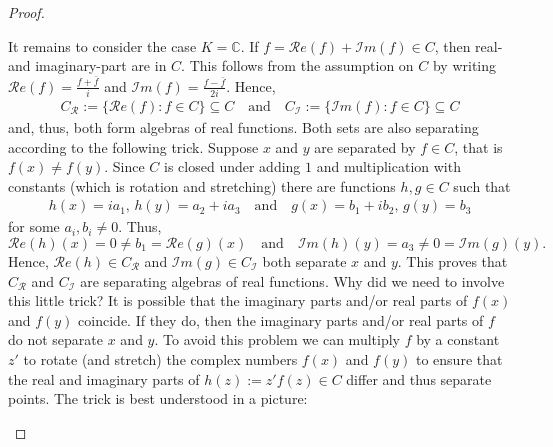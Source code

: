 \begin{proof}[Proof]
\begin{enumerate}[label=(\roman*)]
\end{enumerate}
It remains to consider the case $K = \mathbb{C}$. If $f =\mathcal{R}e(f)+\mathcal{I}m(f) \in C$, then real- and imaginary-part are in $C$. This follows from the assumption on $C$ by writing $\mathcal{R}e(f) = \frac{f + \bar{f}}{i}$ and $\mathcal{I}m(f) = \frac{f - \bar{f}}{2i}$. Hence, 
\begin{align*}
	C_{\mathcal{R}}:=\{ \mathcal{R}e(f) \colon f \in C \}\subseteq C\quad \text{and}\quad 	C_{\mathcal{I}}:=\{ \mathcal{I}m(f) \colon f \in C \} \subseteq C
\end{align*}	
	and, thus, both form algebras of real functions. Both sets are also separating according to the following trick. Suppose $x$ and $y$ are separated by $f\in C$, that is $f(x)\neq f(y)$. Since $C$ is closed under adding $1$ and multiplication with constants (which is rotation and stretching) there are functions $h, g\in C$ such that
	\begin{align*}
		h(x)=ia_1,\, h(y)=a_2+ia_3\quad \text{and}\quad g(x)=b_1+ib_2, \,g(y)=b_3
	\end{align*}
	for some $a_i,b_i\neq 0$.
	Thus, $$\mathcal{R}e(h)(x)=0\neq b_1= \mathcal{R}e(g)(x)\quad \text{and}\quad \mathcal{I}m(h)(y)=a_3\neq 0= \mathcal{I}m(g)(y).$$ Hence, $\mathcal{R}e(h)\in C_{\mathcal{R}}$ and $\mathcal{I}m(g)\in C_{\mathcal{I}}$ both separate $x$ and $y$.
	This proves that $C_{\mathcal R}$ and $C_{\mathcal I}$ are separating algebras of real functions. Why did we need to involve this little trick? It is possible that the imaginary parts and/or real parts of $f(x)$ and $f(y)$ coincide. If they do, then the imaginary parts and/or real parts of $f$ do not separate $x$ and $y$. To avoid this problem we can multiply $f$ by a constant $z'$ to rotate (and stretch) the complex numbers $f(x)$ and $f(y)$ to ensure that the real and imaginary parts of $h(z):=z'f(z)\in C$ differ and thus separate points. The trick is best understood in a picture:
	
\begin{figure}[h]
	\begin{center}
\end{center}
\end{figure}
\end{proof}
